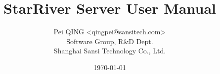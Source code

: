 \title{\textbf{StarRiver Server User Manual}}

\author{Pei QING <qingpei@sansitech.com> \\
        Software Group, R\&D Dept.\\
        Shanghai Sansi Technology Co., Ltd.
}

\date{\today}
